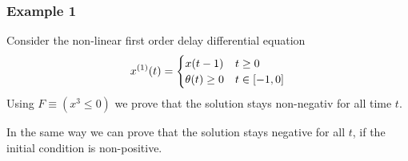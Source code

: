 \documentclass[10pt]{report}
\begin{document}
            \subsubsection{Example 1}
                \label{sec:ddi-example-1}
                Consider the non-linear first order delay differential equation
                \begin{equation}
                    \D{x}(t) = \begin{cases}
                         x(t-1) & t \geq 0\\
                         \theta(t)\geq 0 & t \in [-1,0]
                    \end{cases}
                \end{equation}
                Using $F\equiv(x^3\leq 0)$ we prove that the solution stays non-negativ for all time $t$.
                \begin{sequentdeduction}
                \end{sequentdeduction}
                In the same way we can prove that the solution stays negative for all $t$, if the initial condition is non-positive.
\end{document}

